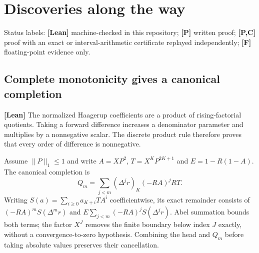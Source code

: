 \documentclass[11pt,a4paper]{article}
\begin{document}
\section{Discoveries along the way}\label{sec:discoveries}
Status labels: \textbf{[Lean]} machine-checked in this repository; \textbf{[P]} written proof; \textbf{[P,C]} proof with an
exact or interval-arithmetic certificate replayed independently; \textbf{[F]} floating-point evidence only.

\subsection{Complete monotonicity gives a canonical completion}
\textbf{[Lean]} The normalized Haagerup coefficients are a product of
rising-factorial quotients. Taking a forward difference increases a denominator
parameter and multiplies by a nonnegative scalar. The discrete product rule
therefore proves that every order of difference is nonnegative.

Assume $\|P\|_1\le1$ and write $A=XP^2$, $T=X^KP^{2K+1}$ and $E=1-R(1-A)$. The canonical completion is
\[
 Q_m=\sum_{j<m}(\Delta^j r)_K(-RA)^jRT.
\]
Writing $S(a)=\sum_{i\ge0}a_{K+i}TA^i$ coefficientwise, its exact remainder
consists of $(-RA)^mS(\Delta^m r)$ and
$E\sum_{j<m}(-RA)^jS(\Delta^j r)$. Abel summation bounds both terms;
the factor $X^J$ removes the finite boundary below index $J$ exactly,
without a convergence-to-zero hypothesis. Combining the head and
$Q_m$ before taking absolute values preserves their cancellation.
\end{document}
